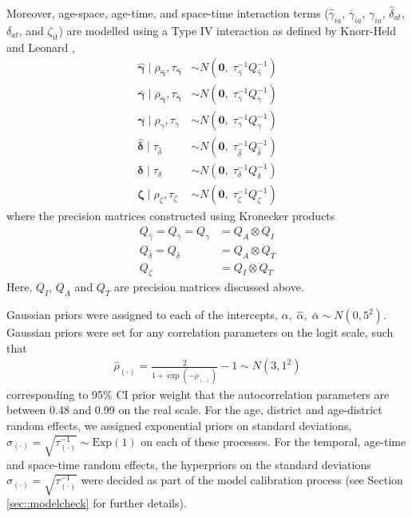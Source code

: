 \documentclass{article}
\begin{document}
\begin{appendix}
Moreover, age-space, age-time, and space-time interaction terms ($\hat{\gamma}_{ia}$, $\bar{\gamma}_{ia}$, $\gamma_{ia}$, $\hat{\delta}_{at}$, $\delta_{at}$, and $\zeta_{it}$) are modelled using a Type IV interaction as defined by Knorr-Held and Leonard \cite{knorr2000bayesian}, 
\begin{align*} 
  \hat{\boldsymbol{\gamma}} \; | \; \rho_{\boldsymbol{\hat{\gamma}}}, \tau_{\boldsymbol{\hat{\gamma}}} &\sim N(\boldsymbol{0}, \;\tau^{-1}_{\hat{\gamma}} Q^{-1}_{\hat{\gamma}}) \\
  \bar{\boldsymbol{\gamma}} \; | \; \rho_{\boldsymbol{\bar{\gamma}}}, \tau_{\boldsymbol{\bar{\gamma}}} &\sim N(\boldsymbol{0}, \;\tau^{-1}_{\bar{\gamma}} Q^{-1}_{\bar{\gamma}}) \\
  \boldsymbol{\gamma} \; | \; \rho_{\gamma}, \tau_{\gamma} &\sim N(\boldsymbol{0}, \;\tau^{-1}_{\gamma} Q^{-1}_{\gamma})\\
  \boldsymbol{\hat{\delta}} \; | \; \tau_{\hat{\delta}} &\sim N(\boldsymbol{0}, \;\tau^{-1}_{\hat{\delta}} Q^{-1}_{\hat{\delta}})\\
  \boldsymbol{\delta} \; | \; \tau_{\delta} &\sim N(\boldsymbol{0}, \;\tau^{-1}_{\delta} Q^{-1}_{\delta})\\
  \boldsymbol{\zeta} \; | \; \rho_{\zeta}, \tau_{\zeta} &\sim N(\boldsymbol{0}, \;\tau^{-1}_{\zeta} Q^{-1}_{\zeta})
\end{align*}
where the precision matrices constructed using Kronecker products 
\begin{align*} 
	Q_{\hat{\gamma}} = Q_{\bar{\gamma}} = Q_{\gamma} &= Q_A \otimes Q_I\\
	Q_{\hat{\delta}} = Q_{\delta} &= Q_A \otimes Q_T\\
	Q_{\zeta} &=Q_I \otimes Q_T
\end{align*}
Here, $Q_I$, $Q_A$ and $Q_T$ are precision matrices discussed above.

Gaussian priors were assigned to each of the intercepts, $\alpha, \;\hat{\alpha}, \;\bar{\alpha} \sim N(0, 5^2)$. Gaussian priors were set for any correlation parameters on the logit scale, such that 
\begin{align*} 
  \hat{\rho}_{(\cdot)} = \frac{2}{1 + \exp(-\rho_{(\cdot)})} - 1 \sim N(3, 1^2)
\end{align*}
corresponding to 95\% CI prior weight that the autocorrelation parameters are between 0.48 and 0.99 on the real scale. For the age, district and age-district random effects, we assigned exponential priors on standard deviations, $\sigma_{(\cdot)} = \sqrt{\tau^{-1}_{(\cdot)}} \sim \text{Exp}(1)$ on each of these processes. For the temporal, age-time and space-time random effects, the hyperpriors on the standard deviations $\sigma_{(\cdot)} = \sqrt{\tau^{-1}_{(\cdot)}}$ were decided as part of the model calibration process (see Section \ref{sec::modelcheck} for further details). 


\end{appendix}
\end{document}
